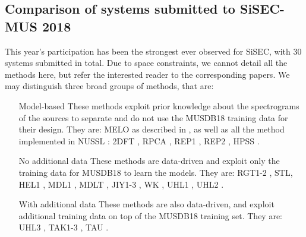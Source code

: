 \documentclass{article}
\begin{document}
\subsection{Comparison of systems submitted to SiSEC-MUS 2018}
This year's participation has been the strongest ever observed for SiSEC, with $30$ systems submitted in total. Due to space constraints, we cannot detail all the methods here, but refer the interested reader to the corresponding papers. We may distinguish three broad groups of methods, that are:
\begin{enumerate}
  \item[Model-based] These methods exploit prior knowledge about the spectrograms of the sources to separate and do not use the MUSDB18 training data for their design. They are: MELO as described in \cite{MELO}, as well as all the method implemented in NUSSL \cite{NUSSL}: 2DFT \cite{2DFT}, RPCA \cite{RPCA}, REP1 \cite{REP1}, REP2 \cite{REP2}, HPSS \cite{HPSS}.
  \item[No additional data] These methods are data-driven and exploit only the
  training data for MUSDB18 to learn the models. They are: RGT1-2 \cite{RGT1}, STL, HEL1 \cite{HEL1}, MDL1 \cite{MDL1}, MDLT \cite{MDLT}, JIY1-3 \cite{JY1}, WK \cite{WK}, UHL1 \cite{UHL1}, UHL2 \cite{UHL2}.
  \item[With additional data] These methods are also data-driven, and exploit additional training data on top of the MUSDB18 training set. They are: UHL3 \cite{UHL2}, TAK1-3 \cite{TAK1}, TAU \cite{TAK1,UHL2}.
\end{enumerate}
\end{document}
